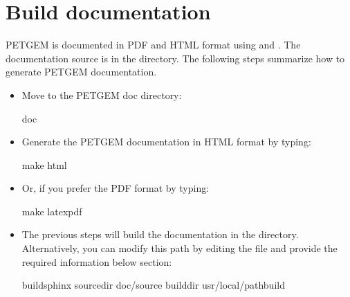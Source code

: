 \documentclass[letterpaper,10pt,english]{sphinxmanual}
\begin{document}
\section{Build documentation}
\label{\detokenize{Installation:build-documentation}}\label{\detokenize{Installation:id2}}
PETGEM is documented in PDF and HTML format using  and
. The documentation source
is in the  directory. The following steps summarize how to generate PETGEM documentation.
\begin{itemize}
\item {} 
Move to the PETGEM doc directory:

\begin{sphinxVerbatim}[commandchars=\\\{\}]
\PYGZdl{}  doc
\end{sphinxVerbatim}

\item {} 
Generate the PETGEM documentation in HTML format by typing:

\begin{sphinxVerbatim}[commandchars=\\\{\}]
\PYGZdl{} make html
\end{sphinxVerbatim}

\item {} 
Or, if you prefer the PDF format by typing:

\begin{sphinxVerbatim}[commandchars=\\\{\}]
\PYGZdl{} make latexpdf
\end{sphinxVerbatim}

\item {} 
The previous steps will build the documentation in the  directory. Alternatively, you can modify this path by editing the file  and provide the required information below  section:

\begin{sphinxVerbatim}[commandchars=\\\{\}]
\PYG{o}{[}build\PYGZus{}sphinx\PYG{o}{]}
source\PYGZhy{}dir  doc/source
build\PYGZhy{}dir   usr/local/path\PYGZhy{}build
   
\end{sphinxVerbatim}

\end{itemize}
\end{document}

